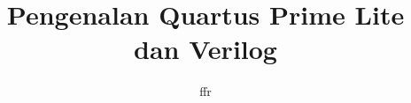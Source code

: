\documentclass[a4paper,11pt,bahasa]{extarticle}
\begin{document}
\title{Pengenalan Quartus Prime Lite dan Verilog}
\author{ffr}
\date{}
\maketitle

\tableofcontents











\appendix


\end{document}
